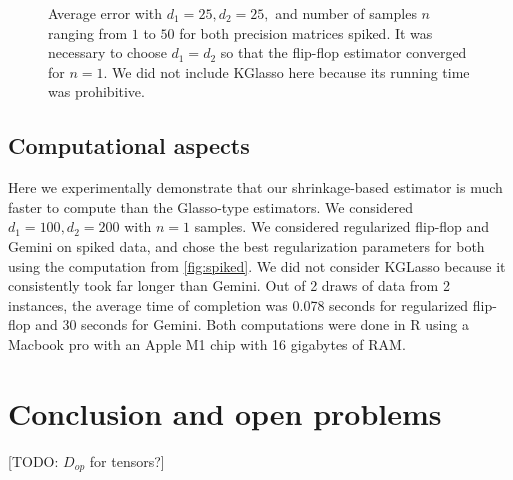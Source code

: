 \documentclass[aos]{imsart}
\theoremstyle{definition}
\numberwithin{equation}{section}
\newcommand{\TODO}[1]{{\color{blue}[TODO: #1]}}
\begin{document}
\begin{figure}
\begin{subfigure}[b]{.4\textwidth}
         \end{subfigure}         
\caption{Average error with $d_1 = 25, d_2 = 25, $ and number of samples $n$ ranging from $1$ to $50$ for both precision matrices spiked. It was necessary to choose $d_1 = d_2$ so that the flip-flop estimator converged for $n = 1$. We did not include KGlasso here because its running time was prohibitive.} \label{fig:lc}
\end{figure}

\subsection{Computational aspects}

Here we experimentally demonstrate that our shrinkage-based estimator is much faster to compute than the Glasso-type estimators. We considered $d_1 =100, d_2 = 200$ with $n = 1$ samples. We considered regularized flip-flop and Gemini on spiked data, and chose the best regularization parameters for both using the computation from \cref{fig:spiked}. We did not consider KGLasso because it consistently took far longer than Gemini. Out of 2 draws of data from 2 instances, the average time of completion was 0.078 seconds for regularized flip-flop and 30 seconds for Gemini. Both computations were done in R using a Macbook pro with an Apple M1 chip with 16 gigabytes of RAM.

\section{Conclusion and open problems}
\TODO{$D_{op}$ for tensors?}
\end{document}
